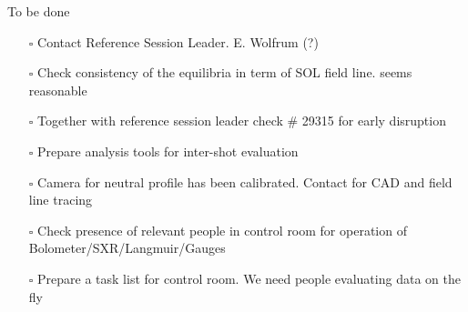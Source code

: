\documentclass[10pt, compress]{beamer}
\begin{document}
  \begin{frame}{To be done}
  \begin{itemize}
    \item[$\square$] Contact Reference Session Leader. E. Wolfrum (?)
    \item[$\square$] Check consistency of the equilibria in term of
      SOL field line. \alert{seems reasonable}
    \item[$\square$] Together with reference session leader check \#
      29315 for early disruption
    \item[$\square$] Prepare analysis tools for inter-shot evaluation
    \item[$\square$] Camera for neutral profile has been
      calibrated. Contact for CAD and field line tracing
    \item[$\square$] Check presence of relevant people in control room
      for operation of Bolometer/SXR/Langmuir/Gauges
    \item[$\square$] Prepare a task list for control room. We need
      people evaluating data on the fly
  \end{itemize}
\end{frame}
\end{document}
